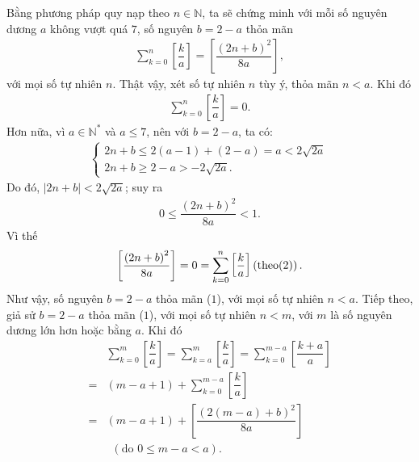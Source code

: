 \begin{multicols}{2}
	\vskip 0.05cm
	Bằng phương pháp quy nạp theo $n \in \mathbb{N}$, ta sẽ chứng minh với mỗi số nguyên dương $a$ không vượt quá $7$, số nguyên $b = 2 - a$ thỏa mãn
	\begin{align*}
		\sum\limits_{k = 0}^n {\left[ {\dfrac{k}{a}} \right]}  = \left[ {\dfrac{{{{\left( {2n + b} \right)}^2}}}{{8a}}} \right], \tag{$1$}
	\end{align*}
	với mọi số tự nhiên $n$.
	\vskip 0.05cm
	Thật vậy, xét số tự nhiên $n$ tùy ý, thỏa mãn $n < a$.
	\vskip 0.05cm
	Khi đó
	\begin{align*}
		\sum\limits_{k = 0}^n {\left[ {\dfrac{k}{a}} \right]}  = 0. \tag{$2$}
	\end{align*}
	Hơn nữa, vì $a \in \mathbb{N^*}$  và $a \le 7$, nên với \linebreak $b = 2 - a$, ta có:
	\begin{align*}
		\begin{cases}
			2n + b \le 2(a-1) + (2-a) = a < 2\sqrt{2a}\\
			2n + b \ge 2 - a > - 2\sqrt{2a}.
		\end{cases}
	\end{align*}
	Do đó, $|2n + b| < 2\sqrt {2a}$;  suy ra
	\begin{align*}
		0 \le \dfrac{{{{\left( {2n + b} \right)}^2}}}{{8a}} < 1.
	\end{align*}
	Vì thế
	\begin{align*}
		\left[ {\dfrac{{{{\left( {2n + b} \right)}^2}}}{{8a}}} \right] = 0 = \sum\limits_{k = 0}^n {\left[ {\dfrac{k}{a}} \right]} \left( {{\rm{theo}}(2)} \right).
	\end{align*}
	Như vậy, số nguyên $b = 2 - a$ thỏa mãn ($1$), với mọi số tự nhiên $n < a$.
	\vskip 0.05cm
	Tiếp theo, giả sử $b = 2 - a$ thỏa mãn ($1$), với mọi số tự nhiên $n < m$, với $m$ là số nguyên dương lớn hơn hoặc bằng $a$.
	\vskip 0.05cm
	\columnbreak
	Khi đó
	\begin{align*}
			&\sum\limits_{k = 0}^m {\left[ {\dfrac{k}{a}} \right]}  = \sum\limits_{k = a}^m {\left[ {\dfrac{k}{a}} \right]}  = \sum\limits_{k = 0}^{m - a} {\left[ {\dfrac{{k + a}}{a}} \right]} \\
			 = &\left( {m - a + 1} \right) + \sum\limits_{k = 0}^{m - a} {\left[ {\dfrac{k}{a}} \right]} \\
			= &\left( {m - a + 1} \right) + \left[ {\dfrac{{{{\left( {2\left( {m - a} \right) + b} \right)}^2}}}{{8a}}} \right] \tag{$3$}\\
			&\,\,\,(\text{do } 0 \le m-a < a).
	\end{align*}

\end{multicols}
